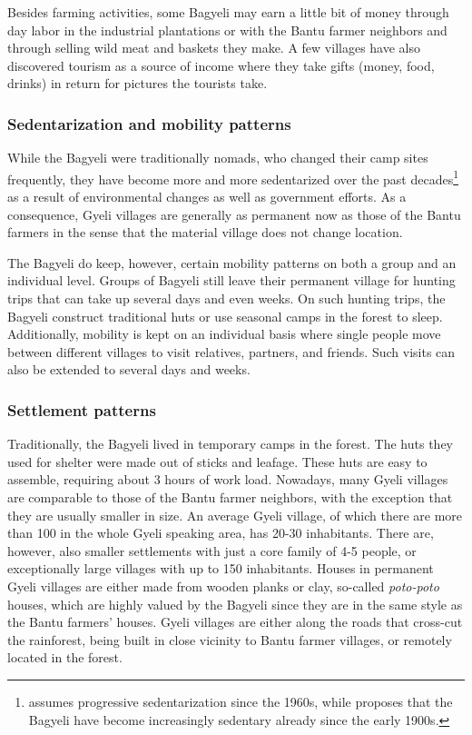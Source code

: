Besides farming activities, some Bagyeli may earn a little bit of money through day labor in the industrial plantations or with the Bantu farmer neighbors and through selling wild meat and baskets they make. A few villages have also discovered tourism as a source of income where they take gifts (money, food, drinks) in return for pictures the tourists take.

\newpage
\subsubsection*{Sedentarization and mobility patterns}
While the Bagyeli were traditionally nomads, who changed their camp sites frequently, they have become more and more sedentarized over the past decades\footnote{\citet[25]{renaud76} assumes progressive sedentarization since the 1960s, while \citet[86]{joiris94} proposes that the Bagyeli have become increasingly sedentary already since the early 1900s.} as a result of environmental changes as well as government efforts. As a consequence, Gyeli villages are generally as permanent now as those of the Bantu farmers in the sense that the material village does not change location.

The Bagyeli do keep, however, certain mobility patterns on both a group and an individual level. Groups of Bagyeli still leave their permanent village for hunting trips that can take up several days and even weeks. On such hunting trips, the Bagyeli construct traditional huts or use seasonal camps in the forest to sleep.  Additionally, mobility is kept on an individual basis where single people move between different villages to visit relatives, partners, and friends. Such visits can also be extended to several days and weeks.


\subsubsection*{Settlement patterns}
Traditionally, the Bagyeli lived in temporary camps in the forest. The huts they used for shelter were made out of sticks and leafage. These huts are easy to assemble, requiring about 3 hours of work load.
Nowadays, many Gyeli villages are comparable to those of the Bantu farmer neighbors, with the exception that they are usually smaller in size. An average Gyeli village, of which there are more than 100 in the whole Gyeli speaking area, has 20-30 inhabitants. There are, however, also smaller settlements with just a core family of 4-5 people, or exceptionally large villages with up to 150 inhabitants.
Houses in permanent Gyeli villages are either made from wooden planks or clay, so-called {\itshape poto-poto} houses, which are highly valued by the Bagyeli since they are in the same style as the Bantu farmers' houses.
Gyeli villages are either along the roads that cross-cut the rainforest, being built in close vicinity to Bantu farmer villages, or remotely located in the forest.

